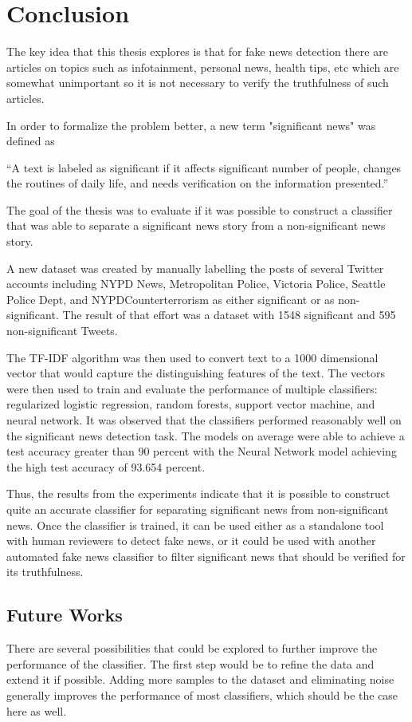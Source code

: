 \chapter{Conclusion}\label{conclusion}
The key idea that this thesis explores is that for fake news detection there are articles on topics such as infotainment, personal news, health tips, etc which are somewhat unimportant so it is not necessary to verify the truthfulness of such articles.

In order to formalize the problem better, a new term "significant news" was defined as

\enquote{A text is labeled as significant if it affects significant number of people, changes the routines of daily life, and needs verification on the information presented.}

The goal of the thesis was to evaluate if it was possible to construct a classifier that was able to separate a significant news story from a non-significant news story.

A new dataset was created by manually labelling the posts of several Twitter accounts including NYPD News, Metropolitan Police, Victoria Police, Seattle Police Dept, and NYPDCounterterrorism as either significant or as non-significant. The result of that effort was a dataset with 1548 significant and 595 non-significant Tweets.

The TF-IDF algorithm was then used to convert text to a 1000 dimensional vector that would capture the distinguishing features of the text. The vectors were then used to train and evaluate the performance of multiple classifiers: regularized logistic regression, random forests, support vector machine, and neural network. It was observed that the classifiers performed reasonably well on the significant news detection task. The models on average were able to achieve a test accuracy greater than 90 percent with the Neural Network model achieving the high test accuracy of 93.654 percent.

Thus, the results from the experiments indicate that it is possible to construct quite an accurate classifier for separating significant news from non-significant news. Once the classifier is trained, it can be used either as a standalone tool with human reviewers to detect fake news, or it could be used with another automated fake news classifier to filter significant news that should be verified for its truthfulness.

\section{Future Works}
There are several possibilities that could be explored to further improve the performance of the classifier. The first step would be to refine the data and extend it if possible. Adding more samples to the dataset and eliminating noise generally improves the performance of most classifiers, which should be the case here as well.

